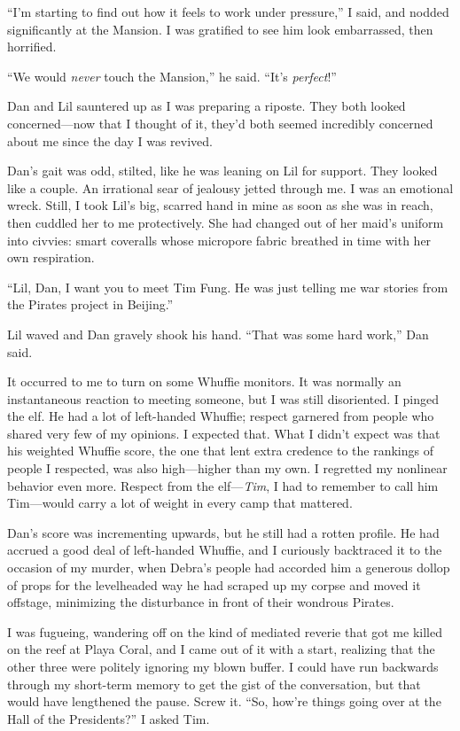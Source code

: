 “I'm starting to find out how it feels to work under pressure,” I
said, and nodded significantly at the Mansion. I was gratified to
see him look embarrassed, then horrified.

“We would \emph{never} touch the Mansion,” he said. “It's
\emph{perfect}!”

Dan and Lil sauntered up as I was preparing a riposte. They both
looked concerned—now that I thought of it, they'd both seemed
incredibly concerned about me since the day I was revived.

Dan's gait was odd, stilted, like he was leaning on Lil for
support. They looked like a couple. An irrational sear of jealousy
jetted through me. I was an emotional wreck. Still, I took Lil's
big, scarred hand in mine as soon as she was in reach, then cuddled
her to me protectively. She had changed out of her maid's uniform
into civvies: smart coveralls whose micropore fabric breathed in
time with her own respiration.

“Lil, Dan, I want you to meet Tim Fung. He was just telling me war
stories from the Pirates project in Beijing.”

Lil waved and Dan gravely shook his hand. “That was some hard
work,” Dan said.

It occurred to me to turn on some Whuffie monitors. It was normally
an instantaneous reaction to meeting someone, but I was still
disoriented. I pinged the elf. He had a lot of left-handed Whuffie;
respect garnered from people who shared very few of my opinions. I
expected that. What I didn't expect was that his weighted Whuffie
score, the one that lent extra credence to the rankings of people I
respected, was also high—higher than my own. I regretted my
nonlinear behavior even more. Respect from the elf—\emph{Tim}, I
had to remember to call him Tim—would carry a lot of weight in
every camp that mattered.

Dan's score was incrementing upwards, but he still had a rotten
profile. He had accrued a good deal of left-handed Whuffie, and I
curiously backtraced it to the occasion of my murder, when Debra's
people had accorded him a generous dollop of props for the
levelheaded way he had scraped up my corpse and moved it offstage,
minimizing the disturbance in front of their wondrous Pirates.

I was fugueing, wandering off on the kind of mediated reverie that
got me killed on the reef at Playa Coral, and I came out of it with
a start, realizing that the other three were politely ignoring my
blown buffer. I could have run backwards through my short-term
memory to get the gist of the conversation, but that would have
lengthened the pause. Screw it. “So, how're things going over at
the Hall of the Presidents?” I asked Tim.


